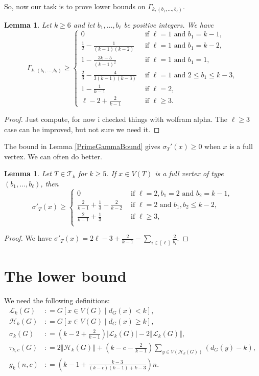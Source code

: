 \documentclass[12pt]{article}
\theoremstyle{plain}
\newtheorem{lem}[thm]{Lemma}
\theoremstyle{definition}
\theoremstyle{remark}
\newcommand{\fancy}[1]{\mathcal{#1}}
\newcommand{\T}{\fancy{T}}
\renewcommand{\L}{\fancy{L}}
\newcommand{\HH}{\fancy{H}}
\newcommand{\card}[1]{\left|#1\right|}
\newcommand{\size}[1]{\left\Vert#1\right\Vert}
\newcommand{\irange}[1]{\left[#1\right]}
\newcommand{\parens}[1]{\left( #1 \right)}
\newcommand{\brackets}[1]{\left[ #1 \right]}
\newcommand{\DefinedAs}{\mathrel{\mathop:}=}
\begin{document}
So, now our task is to prove lower bounds on $\Gamma_{k,(b_1,\ldots,b_{\ell})}$.  

\begin{lem}\label{GammaBound}
	Let $k \ge 6$ and let $b_1, \ldots, b_\ell$ be positive integers.  We have
	\[\Gamma_{k,(b_1,\ldots,b_{\ell})} \ge \begin{cases}
	0 & \text{ if } \ell = 1 \text{ and } b_1 = k-1,\\
	\frac12 - \frac{1}{(k-1)(k-2)} & \text{ if } \ell = 1 \text{ and } b_1 = k-2,\\
	1 - \frac{3k-5}{(k-1)^2} & \text{ if } \ell = 1 \text{ and } b_1 = 1,\\
	\frac23 - \frac{4}{3(k-1)(k-3)} & \text{ if } \ell = 1 \text{ and } 2 \le b_1 \le k-3,\\
	1 - \frac{1}{k-1} & \text{ if } \ell = 2,\\
	\ell - 2 + \frac{2}{k-1} & \text{ if } \ell \ge 3.
	\end{cases}\]
\end{lem}
\begin{proof}
	Just compute, for now i checked things with wolfram alpha.  The $\ell \ge 3$ case can be improved, but not sure we need it.
\end{proof}


The bound in Lemma \ref{PrimeGammaBound} gives $\sigma_T'(x) \ge 0$ when $x$ is a full vertex.  We can often do better.

\begin{lem}\label{BetterFull}
	Let $T \in \T_k$ for $k \ge 5$.  If $x \in V(T)$ is a full vertex of type $(b_1, \ldots, b_\ell)$, then
	\[\sigma'_T(x) \ge \begin{cases}
	0 & \text{ if } \ell = 2, b_1 = 2 \text{ and } b_2 = k-1,\\
	\frac{2}{k-1} + \frac13 - \frac{2}{k-2} & \text{ if } \ell = 2 \text{ and } b_1, b_2 \le k-2,\\
	\frac{2}{k-1} + \frac13 & \text{ if } \ell \ge 3,\\
	\end{cases}\]
\end{lem}
\begin{proof}
	We have $\sigma'_T(x) = 2\ell - 3 + \frac{2}{k-1} - \sum_{i \in \irange{\ell}} \frac{2}{b_i}$.
\end{proof}

\section{The lower bound}
We need the following definitions:
\begin{align*}
\L_k(G) &\DefinedAs G\brackets{x \in V(G) \mid d_G(x) < k},\\
\HH_k(G) &\DefinedAs G\brackets{x \in V(G) \mid d_G(x) \ge k},\\
\sigma_k(G) &\DefinedAs \parens{k-2 + \frac{2}{k-1}}\card{\L_k(G)} - 2\size{\L_k(G)},\\
\tau_{k,c}(G) &\DefinedAs 2\size{\HH_k(G)} + \parens{k-c - \frac{2}{k-1}}\sum_{y \in V(\HH_k(G))} \parens{d_G(y) - k},\\
g_k(n, c) &\DefinedAs \parens{k-1 + \frac{k-3}{(k-c)(k-1) + k-3}}n.\\
\end{align*}
\end{document}

